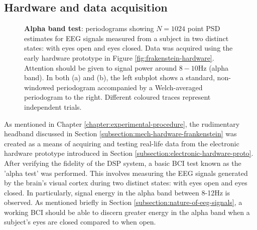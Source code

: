 \subsection{Hardware and data acquisition}

\begin{figure}[htp]

\caption[Alpha band test: periodograms showing $N=1024$ point PSD estimates for EEG signals measured from a subject in two distinct states: with eyes open and eyes closed.]{\textbf{Alpha band test}: periodograms showing $N=1024$ point PSD estimates for EEG signals measured from a subject in two distinct states: with eyes open and eyes closed. Data was acquired using the early hardware prototype in Figure \ref{fig:frakenstein-hardware}. Attention should be given to signal power around $8-10$Hz (alpha band). In both (a) and (b), the left subplot shows a standard, non-windowed periodogram accompanied by a Welch-averaged periodogram to the right. Different coloured traces represent independent trials.}
\label{fig:alpha-periodograms}
\end{figure}

As mentioned in Chapter \ref{chapter:experimental-procedure}, the rudimentary headband discussed in Section \ref{subsection:mech-hardware-frankenstein} was created as a means of acquiring and testing real-life data from the electronic hardware prototype introduced in Section \ref{subsection:electronic-hardware-proto}. After verifying the fidelity of the DSP system, a basic BCI test known as the 'alpha test' was performed. This involves measuring the EEG signals generated by the brain's visual cortex during two distinct states: with eyes open and eyes closed. In particularly, signal energy in the alpha band between 8-12Hz is observed. As mentioned briefly in Section \ref{subsection:nature-of-eeg-signals}, a working BCI should be able to discern greater energy in the alpha band when a subject's eyes are closed compared to when open.

